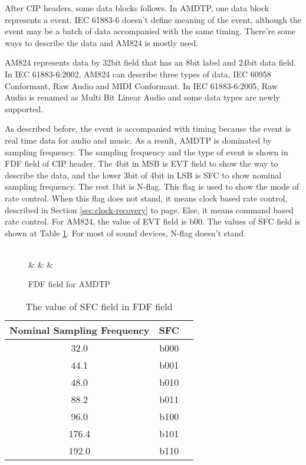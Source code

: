 \documentclass[onecolumn]{article}
\begin{document}
After CIP headers, some data blocks follows. In AMDTP, one data block represents a event. IEC 61883-6\cite{iec61883-6-1, iec61883-6-2} doesn't define meaning of the event, although the event may be a batch of data accompanied with the same timing. There're some ways to describe the data and AM824 is mostly used.

AM824 represents data by 32bit field that has an 8bit label and 24bit data field\cite{iec61883-6-2}. In IEC 61883-6:2002\cite{iec61883-6-1}, AM824 can describe three types of data, IEC 60958 Conformant, Raw Audio and MIDI Conformant. In IEC 61883-6:2005\cite{iec61883-6-2}, Raw Audio is renamed as Multi Bit Linear Audio and some data types are newly supported.

As described before, the event is accompanied with timing because the event is real time data for audio and music. As a result, AMDTP is dominated by sampling frequency. The sampling frequency and the type of event is shown in FDF field of CIP header. The 4bit in MSB is EVT field to show the way to describe the data, and the lower 3bit of 4bit in LSB is SFC to show nominal sampling frequency. The rest 1bit is N-flag. This flag is used to show the mode of rate control. When this flag does not stand, it means clock based rate control, described in Section \ref{sec:clock-recovery} to page\pageref{sec:clock-recovery}. Else, it means command based rate control\cite{iec61883-6-2, avc-rate-control}. For AM824, the value of EVT field is b00. The values of SFC field is shown at Table \ref{tbl:sfc-fdf}. For most of sound devices, N-flag doesn't stand.

\begin{figure}[H]
\centering
\begin{bytefield}[bitwidth=auto,endianness=big]{8}
	 \\
	 &
	 &
	 &
\end{bytefield}
\caption{FDF field for AMDTP}
\label{amdtp-fdf}
\end{figure}

\begin{table}[H]
	\centering
	\caption{{The value of SFC field in FDF field}}
	\label{tbl:sfc-fdf}
	\begin{tabular}{ccc} \toprule
		Nominal Sampling Frequency & SFC \\ \midrule
		32.0	& b000 \\
		44.1	& b001 \\
		48.0	& b010 \\
		88.2	& b011 \\
		96.0	& b100 \\
		176.4	& b101 \\
		192.0	& b110 \\ \bottomrule
	\end{tabular}
\end{table}
\end{document}
